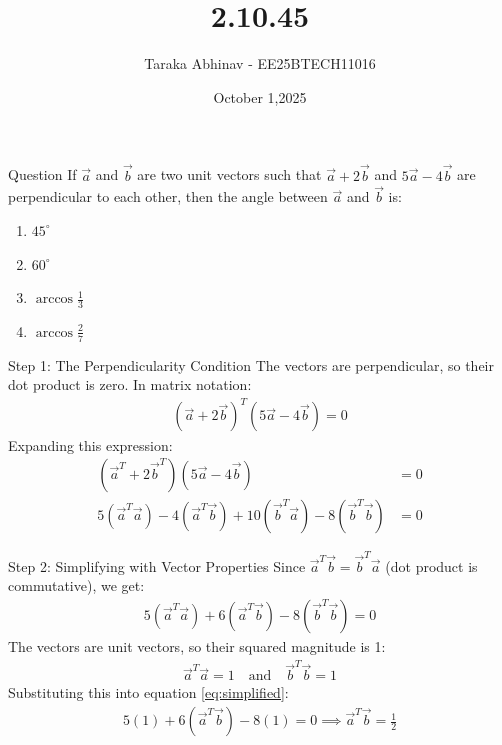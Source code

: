 \documentclass{beamer}
\title %
{2.10.45}
\date{October 1,2025}
\author %
{Taraka Abhinav - EE25BTECH11016}
\begin{document}
\frame{\titlepage}


\begin{frame}{Question}
If $\vec{a}$ and $\vec{b}$ are two unit vectors such that $\vec{a} + 2\vec{b}$ and $5\vec{a} - 4\vec{b}$ are perpendicular to each other, then the angle between $\vec{a}$ and $\vec{b}$ is:

\begin{enumerate}

    \item $45^\circ$
    \item $60^\circ$
    \item $\arccos \frac{1}{3}$
    \item $\arccos \frac{2}{7}$
\end{enumerate}
\end{frame}

\begin{frame}{Step 1: The Perpendicularity Condition}
The vectors are perpendicular, so their dot product is zero. In matrix notation:
\begin{align}
    (\vec{a} + 2\vec{b})^T (5\vec{a} - 4\vec{b}) = 0 \label{eq:perp_condition}
\end{align}
Expanding this expression:
\begin{align}
    (\vec{a}^T + 2\vec{b}^T) (5\vec{a} - 4\vec{b}) &= 0 \nonumber \\
    5(\vec{a}^T\vec{a}) - 4(\vec{a}^T\vec{b}) + 10(\vec{b}^T\vec{a}) - 8(\vec{b}^T\vec{b}) &= 0 \label{eq:expanded}
\end{align}
\end{frame}

\begin{frame}{Step 2: Simplifying with Vector Properties}
Since $\vec{a}^T\vec{b} = \vec{b}^T\vec{a}$ (dot product is commutative), we get:
\begin{align}
    5(\vec{a}^T\vec{a}) + 6(\vec{a}^T\vec{b}) - 8(\vec{b}^T\vec{b}) = 0 \label{eq:simplified}
\end{align}
The vectors are unit vectors, so their squared magnitude is 1:
\begin{align}
    \vec{a}^T\vec{a} = 1 \quad \text{and} \quad \vec{b}^T\vec{b} = 1 \label{eq:unit_vectors}
\end{align}
Substituting this into equation \eqref{eq:simplified}:
\begin{align}
    5(1) + 6(\vec{a}^T\vec{b}) - 8(1) = 0 \implies \vec{a}^T\vec{b} = \frac{1}{2} \label{eq:dot_product_value}
\end{align}
\end{frame}
\end{document}
